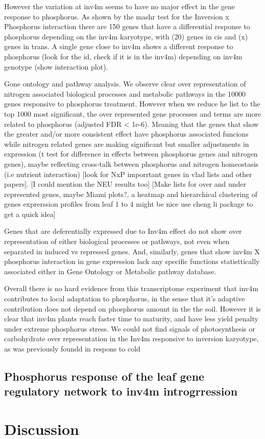 However the variation at inv4m seems to have no major effect in the gene response to phosphorus.
As shown by the mashr test for the Inversion x Phosphorus interaction there are 150 genes that have a differential response to phosphorus depending on the inv4m karyotype, with (20) genes in cis and (x) genes in trans.
A single gene close to inv4m shows a different response  to phosphorus (look for the id, check if it is in the inv4m) depending on inv4m genotype (show interaction plot).

Gone ontology and pathway analysis. 
We observe clear over representation of nitrogen associated biological processes and metabolic pathways in  the 10000 genes responsive to phosphorus treatment.
However when we reduce he list to the top 1000 most significant, the over represented gene processes and terms are more related to phosphorus (adjusted FDR < 1e-6). 
Meaning that the genes that show the greater and/or more consistent effect  have phosphorus associated funcions while nitrogen related genes are making significant but smaller adjustments in expression (t test for difference in effects between phosphorus genes and nitrogen genes), maybe reflecting cross-talk between phosphorus and nitrogen homeostasis (i.e nutrient interaction) \citep{torres-rodriguez2021} [look for NxP imporrtant genes in vlad lists and other papers]. [I could mention the NEU results too]
[Make lists for over and under represented genes, maybe Miami plots?, a heatmap and hierarchical clustering of genes exprerssion profiles from leaf 1 to 4 might be nice use cheng li package to get a quick idea]

Genes that are deferentially expressed  due to Inv4m effect do not show over representation of either biological processes or pathways, not even when separated in induced vs repressed genes.
And, similarly, genes that show inv4m X phosphorus interaction in gene expression lack any specific functions statisttically associated either in Gene Ontology or Metabolic pathway database.

Overall there is no hard evidence from this transcriptome experiment that inv4m contributes to local adaptation to phosphorus, in the sense that it's adaptive contribution does not depend on phosphorus amount in the the soil.
However it is clear that inv4m plants reach faster time to maturity, and have less yield penalty under extreme phosphorus stress.
We could not find signals of photosynthesis or carbohydrate over representation in the Inv4m responsive to inversion karyotype, as was previously foundd in respons to cold \citep{crow2020}


\subsection{Phosphorus response of the leaf gene regulatory network to inv4m introgrression}
\section{Discussion}


\printbibliography[heading=subbibintoc, title=References]